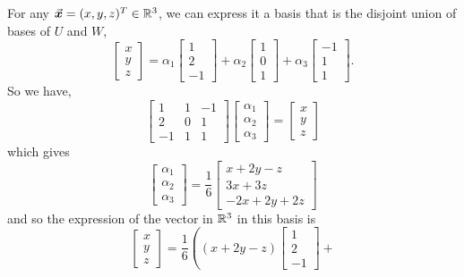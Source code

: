 \documentclass[../MathsNotesBase.tex]{subfiles}
\begin{document}
{\begin{exe}
{{			For any ${ \vec{\bm{x}} = (x,y,z)^T \in \mathbb{R}^{3} }$, we can express it \wrt a basis that is the disjoint union of bases of $U$ and $W$,
			\[
				\begin{bmatrix}x\\ y\\ z\end{bmatrix} = \alpha_1 \begin{bmatrix}1\\ 2\\ -1\end{bmatrix} + 
					\alpha_2 \begin{bmatrix}1\\ 0\\ 1\end{bmatrix} + \alpha_3 \begin{bmatrix}-1\\ 1\\ 1\end{bmatrix}.
			\]
			So we have,
			\[
				\begin{bmatrix}
					1 & 1 & -1\\
					2 & 0 & 1\\
					-1 & 1 & 1
				\end{bmatrix} \begin{bmatrix}\alpha_1\\ \alpha_2\\ \alpha_3\end{bmatrix} =
				\begin{bmatrix}x\\ y\\ z\end{bmatrix}
			\]
			which gives
			\[
				 \begin{bmatrix}\alpha_1\\ \alpha_2\\ \alpha_3\end{bmatrix} = 
				 \frac{1}{6}
				 \begin{bmatrix}
				 	x + 2y - z\\
				 	3x + 3z\\
				 	-2x + 2y + 2z
				 \end{bmatrix}
			\]
			and so the expression of the vector in $\mathbb{R}^{3}$ in this basis is
			\[ 
				\begin{bmatrix}x\\ y\\ z\end{bmatrix} = \frac{1}{6}\left( 
									(x + 2y - z) \begin{bmatrix}1\\ 2\\ -1\end{bmatrix} + 
\]}}
\end{exe}}
\end{document}
